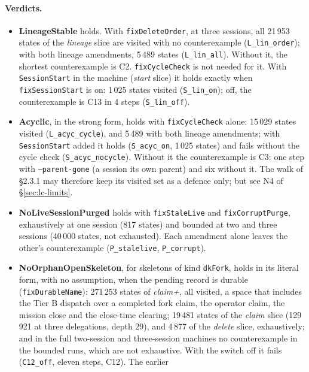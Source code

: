 \documentclass[a4paper,10pt,fleqn]{article}
\newcommand{\field}[1]{\texttt{#1}}
\begin{document}
\paragraph{Verdicts.}
\begin{itemize}
  \item \textbf{LineageStable} holds. With \field{fixDeleteOrder}, at three
    sessions, all 21\,953 states of the \emph{lineage} slice are
    visited with no counterexample (\texttt{L\_lin\_order}); with both lineage
    amendments, 5\,489 states (\texttt{L\_lin\_all}). Without it, the
    shortest counterexample is C2. \field{fixCycleCheck} is not needed for it.
    With \field{SessionStart} in the machine (\emph{start} slice) it holds
    exactly when \field{fixSessionStart} is on: 1\,025 states
    visited (\texttt{S\_lin\_on}); off, the counterexample is C13 in
    4 steps (\texttt{S\_lin\_off}).
  \item \textbf{Acyclic}, in the strong form, holds with \field{fixCycleCheck}
    alone: 15\,029 states visited (\texttt{L\_acyc\_cycle}), and 5\,489 with both
    lineage amendments; with \field{SessionStart} added it holds
    (\texttt{S\_acyc\_on}, 1\,025 states) and fails without the cycle check
    (\texttt{S\_acyc\_nocycle}). Without it the counterexample is C3: one step with
    \field{--parent-gone} (a session its own parent) and six without it. The walk of \S2.3.1 may
    therefore keep its visited set as a defence only; but see N4 of
    \S\ref{sec:lc-limits}.
  \item \textbf{NoLiveSessionPurged} holds with \field{fixStaleLive} and
    \field{fixCorruptPurge}, exhaustively at one session (817 states) and
    bounded at two and three sessions (40\,000 states, not exhausted).
    Each amendment alone leaves the other's counterexample
    (\texttt{P\_stalelive}, \texttt{P\_corrupt}).
  \item \textbf{NoOrphanOpenSkeleton}, for skeletons of kind \field{dkFork},
    holds in its literal form, with no assumption, when the pending record is
    durable (\field{fixDurableName}): 271\,253 states of \emph{claim+}, all
    visited, a space that includes the Tier B dispatch over a completed fork
    claim, the operator claim, the mission close and the close-time clearing;
    19\,481 states of the \emph{claim} slice (129\,921 at three
    delegations, depth 29), and 4\,877 of the \emph{delete} slice,
    exhaustively; and in the full two-session and three-session machines no
    counterexample in the bounded runs, which are not exhaustive. With the
    switch off it fails (\texttt{C12\_off}, eleven steps, C12). The earlier

\end{itemize}
\end{document}
